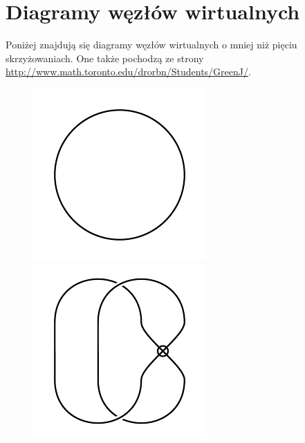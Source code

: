 \section{Diagramy węzłów wirtualnych}
Poniżej znajdują się diagramy węzłów wirtualnych o mniej niż pięciu skrzyżowaniach.
One także pochodzą ze strony \url{http://www.math.toronto.edu/drorbn/Students/GreenJ/}.

\begin{figure}[H]
\begin{minipage}[b]{.18\linewidth}
\centering
\includegraphics[width=\linewidth]{../data/virtual_0_1.png}
\end{minipage}
\begin{minipage}[b]{.18\linewidth}
\centering
\includegraphics[width=\linewidth]{../data/virtual_2_1.png}

\end{minipage}
\end{figure}
